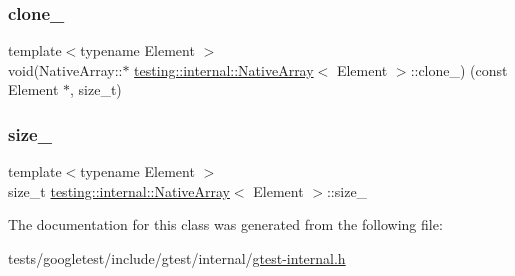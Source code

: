 \mbox{\label{classtesting_1_1internal_1_1NativeArray_addd7442a10398a60215a9989bcbd8078}} 
\subsubsection{\texorpdfstring{clone\+\_\+}{clone\_}}
{\footnotesize\ttfamily template$<$typename Element $>$ \\
void(Native\+Array\+::$\ast$ \hyperlink{classtesting_1_1internal_1_1NativeArray}{testing\+::internal\+::\+Native\+Array}$<$ Element $>$\+::clone\+\_\+) (const Element $\ast$, size\+\_\+t)\hspace{0.3cm}{\ttfamily [private]}}

\mbox{\label{classtesting_1_1internal_1_1NativeArray_aa7e4251de39aaa75f697f0eaeedbf06e}} 
\subsubsection{\texorpdfstring{size\+\_\+}{size\_}}
{\footnotesize\ttfamily template$<$typename Element $>$ \\
size\+\_\+t \hyperlink{classtesting_1_1internal_1_1NativeArray}{testing\+::internal\+::\+Native\+Array}$<$ Element $>$\+::size\+\_\+\hspace{0.3cm}{\ttfamily [private]}}



The documentation for this class was generated from the following file\+:\begin{DoxyCompactItemize}
\item 
tests/googletest/include/gtest/internal/\hyperlink{gtest-internal_8h}{gtest-\/internal.\+h}\end{DoxyCompactItemize}
